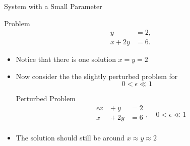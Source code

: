\documentclass[10pt]{beamer}
\begin{document}
\begin{frame}{System with a Small Parameter}
\begin{block}{Problem}
\[
\begin{aligned}
    y &= 2,\\
    x+2y &= 6.
\end{aligned}
\]
\end{block}

\begin{itemize}
    \item Notice that there is one solution $x=y=2$
    \item Now consider the the slightly perturbed problem for 
    $$ 0 < \epsilon \ll 1$$

\begin{block}{Perturbed Problem}
\[
\begin{alignedat}{4}
    &\epsilon x  &{}+ y  &= 2 \\
    &x &{}+ 2y   &= 6 \\
\end{alignedat},\quad 0<\epsilon\ll1
\]
\end{block}
    \item The solution should still be around $x\approx y\approx  2$
\end{itemize}
\end{frame}

\end{document}
